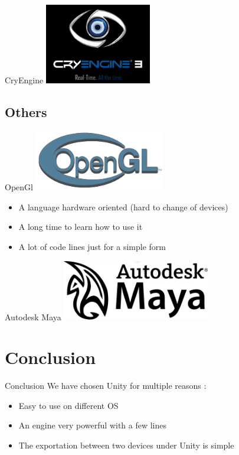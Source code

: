 \documentclass[a4paper,10pt]{beamer}
\begin{document}
			\begin{frame}{CryEngine}
				\includegraphics[height=100pt]{images/Cry_Engine.png}
			\end{frame}
			
		\subsection{Others}
			
			\begin{frame}{OpenGl}
				\includegraphics[height=75pt]{images/OpenGL_logo.png}
				\begin{itemize}
					\item A language hardware oriented (hard to change of devices)
					\item A long time to learn how to use it
					\item A lot of code lines just for a simple form
				\end{itemize}
			\end{frame}
			
			\begin{frame}{Autodesk Maya}
				\includegraphics[height=75pt]{images/Autodesk_Maya.png}
			\end{frame}
			
	\section{Conclusion}
		
		\begin{frame}{Conclusion}
			We have chosen Unity for multiple reasons :
			\begin{itemize}
				\item Easy to use on different OS
				\item An engine very powerful with a few lines
				\item The exportation between two devices under Unity is simple
			\end{itemize}			
		\end{frame}
	
\end{document}
